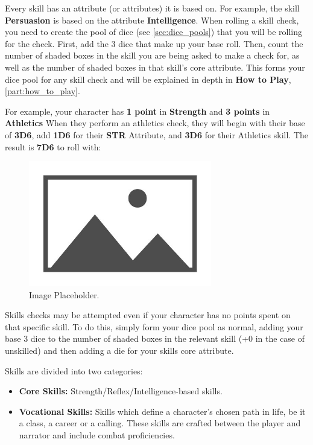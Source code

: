 Every skill has an attribute (or attributes) it is based on. For example, the skill \textbf{Persuasion} is based on the attribute \textbf{Intelligence}. When rolling a skill check, you need to create the pool of dice (see \autoref{sec:dice_pools}) that you will be rolling for the check. First, add the 3 dice that make up your base roll. Then, count the number of shaded boxes in the skill you are being asked to make a check for, as well as the number of shaded boxes in that skill's core attribute. This forms your dice pool for any skill check and will be explained in depth in \textbf{How to Play}, \autoref{part:how_to_play}.

For example, your character has \textbf{1 point} in \textbf{Strength} and \textbf{3 points} in \textbf{Athletics} When they perform an athletics check, they will begin with their base of \textbf{3D6}, add \textbf{1D6} for their \textbf{STR} Attribute, and \textbf{3D6} for their Athletics skill. The result is \textbf{7D6} to roll with:

\begin{figure}[H]
    \includegraphics[width=8cm]{images/placeholder}
    \centering
    \caption{Image Placeholder.}
\end{figure}

Skills checks may be attempted even if your character has no points spent on that specific skill. To do this, simply form your dice pool as normal, adding your base 3 dice to the number of shaded boxes in the relevant skill (+0 in the case of unskilled) and then adding a die for your skills core attribute.

Skills are divided into two categories:

\begin{itemize}
    \item \textbf{Core Skills:} Strength/Reflex/Intelligence-based skills.
    \item \textbf{Vocational Skills:} Skills which define a character's chosen path in life, be it a class, a career or a calling. These skills are crafted between the player and narrator and include combat proficiencies.
\end{itemize}

